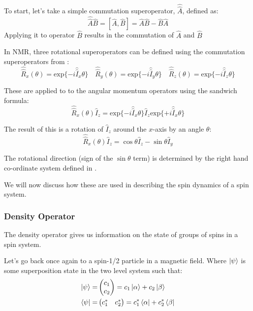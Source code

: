To start, let's take a simple commutation superoperator, $\hat{\hat{A}}$, defined as:
\begin{equation}
  \hat{\hat{A}}\hat{B} = [\hat{A},\hat{B}] = \hat{A}\hat{B} - \hat{B}\hat{A}
\end{equation}
Applying it to operator $\hat{B}$ results in the commutation of $\hat{A}$ and $\hat{B}$

In NMR, three rotational superoperators can be defined using the commutation superoperators from :
\begin{equation}
 \hat{\hat{R}}_x(\theta) = \text{exp}\{-i\hat{\hat{I}}_x\theta\}\quad\hat{\hat{R}}_y(\theta) = \text{exp}\{-i\hat{\hat{I}}_y\theta\}\quad\hat{\hat{R}}_z(\theta) = \text{exp}\{-i\hat{\hat{I}}_z\theta\}
\end{equation}

These are applied to to the angular momentum operators using the sandwich formula:
\begin{equation}
  \hat{\hat{R}}_x(\theta)\hat{I}_z = \text{exp}\{-i\hat{\hat{I}}_x\theta\}\hat{I}_z\text{exp}\{+i\hat{\hat{I}}_x\theta\}
\end{equation}

The result of this is a rotation of $\hat{I}_z$ around the $x$-axis by an angle $\theta$:
\begin{equation}
  \hat{\hat{R}}_x(\theta)\hat{I}_z = \cos{\theta}\hat{I}_z - \sin{\theta}\hat{I}_y
\end{equation}

The rotational direction (sign of the $\sin{\theta}$ term) is determined by the right hand co-ordinate system defined in .

We will now discuss how these are used in describing the spin dynamics of a spin system.

\subsubsection{Density Operator}

The density operator gives us information on the state of groups of spins in a spin system.

Let's go back once again to a spin-1/2 particle in a magnetic field. Where $\ket{\psi}$ is some superposition state in the two level system such that:
\begin{align}
\ket{\psi} =& \begin{pmatrix}
    c_1\\
    c_2
\end{pmatrix} = c_1\ket{\alpha} + c_2\ket{\beta}\\
\bra{\psi} =& \begin{pmatrix}
  c_1^* & c_2^*
\end{pmatrix} = c_1^*\bra{\alpha} + c_2^*\bra{\beta}
\end{align}

